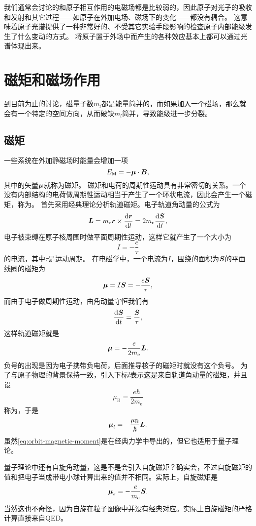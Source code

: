 我们通常会讨论的和原子相互作用的电磁场都是比较弱的，因此原子对光子的吸收和发射和其它过程——如原子在外加电场、磁场下的变化——都没有耦合。
这意味着原子光谱提供了一种非常好的、不受其它实验手段影响的检查原子内部能级发生了什么变动的方式。
将原子置于外场中而产生的各种效应基本上都可以通过光谱体现出来。

\section{磁矩和磁场作用}

到目前为止的讨论，磁量子数$m_l$都是能量简并的，而如果加入一个磁场，那么就会有一个特定的空间方向，从而破缺$m_l$简并，导致能级进一步分裂。

\subsection{磁矩}

一些系统在外加静磁场时能量会增加一项
\[
    E_\text{M} = - \vb*{\mu} \cdot \vb*{B},
\]
其中的矢量$\vb*{\mu}$就称为磁矩。
磁矩和电荷的周期性运动具有非常密切的关系。一个没有内部结构的电荷做周期性运动相当于产生了一个环状电流，因此会产生一个磁矩，称为。
首先采用经典理论分析轨道磁矩。电子轨道角动量的公式为
\[
    \vb*{L} = m_\text{e} \vb*{r} \times \dv{\vb*{r}}{t} = 2 m_\text{e} \dv{\vb*{S}}{t},
\]
电子被束缚在原子核周围时做平面周期性运动，这样它就产生了一个大小为
\[
    I = - \frac{e}{\tau}
\]
的电流，其中$\tau$是运动周期。
在电磁学中，一个电流为$I$，围绕的面积为$\vb*{S}$的平面线圈的磁矩为
\[
    \vb*{\mu} = I \vb*{S} = - \frac{e \vb*{S}}{\tau},
\]
而由于电子做周期性运动，由角动量守恒我们有
\[
    \dv{\vb*{S}}{t} = \frac{\vb*{S}}{\tau},
\]
这样轨道磁矩就是
\[
    \vb*{\mu} = - \frac{e}{2m_\text{e}} \vb*{L}.
\]
负号的出现是因为电子携带负电荷，后面推导核子的磁矩时就没有这个负号。
为了与原子物理的背景保持一致，引入下标$l$表示这是来自轨道角动量的磁矩，并且设
\begin{equation}
    \mu_\text{B} = \frac{e\hbar}{2m_\text{e}}
\end{equation}
称为，于是
\begin{equation}
    \vb*{\mu}_l = - \frac{\mu_\text{B}}{\hbar} \vb*{L}.
    \label{eq:orbit-magnetic-moment}
\end{equation}
虽然\eqref{eq:orbit-magnetic-moment}是在经典力学中导出的，但它也适用于量子理论。

量子理论中还有自旋角动量，这是不是会引入自旋磁矩？确实会，不过自旋磁矩的值和把电子当成带电小球计算出来的值并不相同。实际上，自旋磁矩是
\begin{equation}
    \vb*{\mu}_s = - \frac{e}{m_\text{e}} \vb*{S}.
\end{equation}
当然这也不奇怪，因为自旋在粒子图像中并没有经典对应。实际上自旋磁矩的严格计算直接来自QED。

